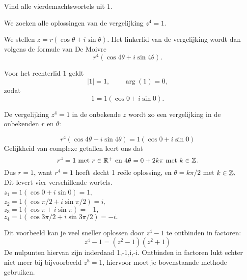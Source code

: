 \documentclass{ximera}
\begin{document}
\begin{example}
    Vind alle vierdemachtswortels uit $1$.
    \begin{oplossing}
    We zoeken alle oplossingen van de vergelijking $z^4=1.$
     
    We stellen $z = r(\cos\theta+i\sin\theta)$.
    Het linkerlid van de vergelijking wordt dan volgens de formule van De Moivre $$r^4(\cos 4\theta+i\sin 4\theta).$$
     
    Voor het rechterlid $1$ geldt
    \[ |1| = 1, \qquad \arg (1) = 0, \]
    zodat
    \[ 1 = 1(\cos 0+i\sin 0). \]
     
    De
    vergelijking $z^4=1$ in de onbekende $z$ wordt zo een vergelijking in de onbekenden $r$ en $\theta$:
     
    $$r^4(\cos 4\theta+i\sin 4\theta) =1(\cos 0+i\sin 0)$$
    Gelijkheid van complexe getallen leert ons dat $$\mbox{$r^4=1$ met $r\in \mathbb{R}^+$ en
        $4\theta
        =0+2k\pi$ met $k\in \mathbb{Z}.$}$$ Dus $r=1$, want $r^4=1$ heeft slecht 1 reële oplossing, en $\theta=k\pi/2$ met $k\in
    \mathbb{Z}.$
    \\Dit levert vier verschillende wortels.
    \\$z_1=1(\cos 0+i\sin 0)=1$,
    \\$z_2=1(\cos \pi/2+i\sin \pi/2) =i$,
    \\$z_3=1 (\cos \pi+i\sin \pi) =-1,$
    \\$z_4=1 (\cos 3\pi/2+i\sin 3\pi/2)=-i.$
     
     
    Dit voorbeeld kan je veel sneller oplossen door $z^4-1$ te ontbinden in factoren:
    $$ z^4-1=(z^2-1)(z^2+1)$$
    De nulpunten hiervan zijn inderdaad 1,-1,i,-i. Ontbinden in factoren lukt echter niet meer bij bijvoorbeeld $z^5=1$, hiervoor moet je bovenstaande methode gebruiken.
    \end{oplossing}
    \end{example}
 
\end{document}
